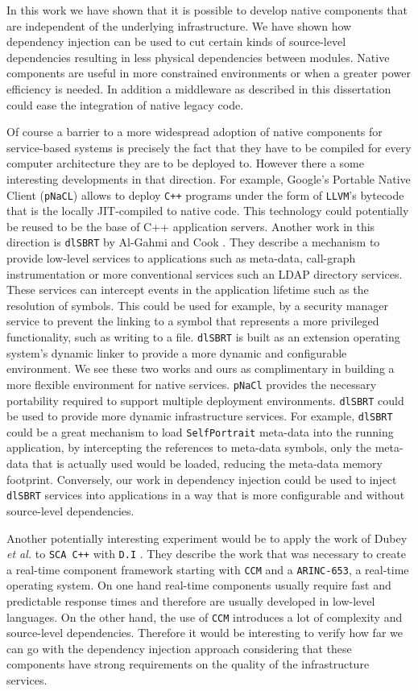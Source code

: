 In this work we have shown that it is possible to develop native components that are independent of the
underlying infrastructure. We have shown how dependency injection can be used to cut certain kinds
of source-level dependencies resulting in less physical dependencies between modules. Native components
are useful in more constrained environments or when a greater power efficiency is needed. In addition
a middleware as described in this dissertation could ease the integration of native legacy code.

Of course a barrier to a more widespread adoption of native components for service-based systems is precisely
the fact that they have to be compiled for every computer architecture they are to be deployed to. However
there a some interesting developments in that direction. For example, Google's Portable Native Client (\texttt{pNaCL}) \cite{pNaCl}
allows to deploy \texttt{C++} programs under the form of \texttt{LLVM}'s bytecode that is the locally JIT-compiled to native code.
This technology could potentially be reused to be the base of C++ application servers. Another work in this
direction is \texttt{dlSBRT} by Al-Gahmi and Cook \cite{Al-Gahmi}. They describe a mechanism to provide low-level services
to applications such as meta-data, call-graph instrumentation or more conventional services such an LDAP
directory services. These services can intercept events in the application lifetime such as the resolution of
symbols. This could be used for example, by a security manager service to prevent the linking to a symbol
that represents a more privileged functionality, such as writing to a file. \texttt{dlSBRT} is built as an extension
operating system's dynamic linker to provide a more dynamic and configurable environment.
We see these two works and ours as complimentary in building a more flexible environment for native services.
\texttt{pNaCl} provides the necessary portability required to support multiple deployment environments. \texttt{dlSBRT} could
be used to provide more dynamic infrastructure services. For example, \texttt{dlSBRT} could be a great mechanism to load
\texttt{SelfPortrait} meta-data into the running application, by intercepting the references to meta-data symbols, only
the meta-data that is actually used would be loaded, reducing the meta-data memory footprint. Conversely, our
work in dependency injection could be used to inject \texttt{dlSBRT} services into applications in a way that is more
configurable and without source-level dependencies.

Another potentially interesting experiment would be to apply the work of Dubey \emph{et al.} to \texttt{SCA C++} with \texttt{D.I} \cite{Dubey}.
They describe the work that was necessary to create a real-time component framework starting with \texttt{CCM} and a \texttt{ARINC-653},
a real-time operating system. On one hand real-time components usually require fast and predictable response times and therefore
are usually developed in low-level languages. On the other hand, the use of \texttt{CCM} introduces a lot of complexity and source-level
dependencies. Therefore it would be interesting to verify how far we can go with the dependency injection approach considering
that these components have strong requirements on the quality of the infrastructure services.

